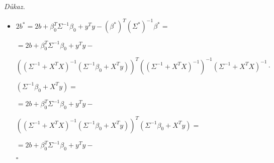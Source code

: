 \documentclass{article}
\newenvironment{pitemize}{
\begin{itemize}
  \setlength{\itemsep}{5pt}
  \setlength{\parskip}{0pt}
  \setlength{\parsep}{0pt}
}{\end{itemize}}
\newenvironment{pproof}{
\noindent\emph{Důkaz.}
\begin{pitemize}
}{\hfill$\square$\end{pitemize}}
\theoremstyle{definition}
\begin{document}
\begin{pproof}
$+(
(\Sigma^{-1}+X^TX)^{-1}(\Sigma^{-1}\beta_0+X^Ty)
)^T
(\Sigma^{-1}\beta_0+X^Ty)=
$


$=\beta^T(\Sigma^{-1}+X^TX)\beta-
2\beta^T(\Sigma^{-1}\beta_0+X^Ty)
+ $
\nopagebreak

$+
(\Sigma^{-1}\beta_0+X^Ty)^T
((\Sigma^{-1}+X^TX)^{-1})^T
(\Sigma^{-1}\beta_0+X^Ty)=
$

$=\beta^T\Sigma^{-1}\beta
+\beta^TX^TX\beta
-2\beta^T\Sigma^{-1}\beta_0
-2\beta^TX^Ty
+ $
\nopagebreak

$+
(\Sigma^{-1}\beta_0+X^Ty)^T
((\Sigma^{-1}+X^TX)^{-1})^T
(\Sigma^{-1}\beta_0+X^Ty)=
$

$=\beta^T\Sigma^{-1}\beta
+\beta^TX^TX\beta
-2\beta^T\Sigma^{-1}\beta_0
-2\beta^TX^Ty
+ $
\nopagebreak

$+
\beta_0^T{\Sigma^{-1}}^T
((\Sigma^{-1}+X^TX)^{-1})^T
\Sigma^{-1}\beta_0
+2
y^TX
((\Sigma^{-1}+X^TX)^{-1})^T
\Sigma^{-1}\beta_0
+$
\nopagebreak


$+y^TX
((\Sigma^{-1}+X^TX)^{-1})^T
X^Ty=
$

$=\beta^T\Sigma^{-1}\beta
+\beta^TX^TX\beta
-2\beta^T\Sigma^{-1}\beta_0
-2\beta^TX^Ty
+ $
\nopagebreak

$+
\beta_0^T{\Sigma^{-1}}
(\Sigma^{-1}+X^TX)^{-1}
\Sigma^{-1}\beta_0
+2
y^TX
(\Sigma^{-1}+X^TX)^{-1}
\Sigma^{-1}\beta_0
+$
\nopagebreak


$+y^TX
(\Sigma^{-1}+X^TX)^{-1}
X^Ty=
$

$=\beta^T\Sigma^{-1}\beta
+\beta^TX^TX\beta
-2\beta^T\Sigma^{-1}\beta_0
-2\beta^TX^Ty
+ $
\nopagebreak

$+
\beta_0^T{\Sigma^{-1}}
{\Sigma^*}
\Sigma^{-1}\beta_0
+2
y^TX
{\Sigma^*}
\Sigma^{-1}\beta_0
+$
\nopagebreak


$+y^TX
{\Sigma^*}
X^Ty
$

\item $2b^*=2b+\beta_0^T\Sigma^{-1}\beta_0+y^Ty
-(\beta^*)^T(\Sigma^*)^{-1}\beta^*=$

$=2b+\beta_0^T\Sigma^{-1}\beta_0+y^Ty
-$
\nopagebreak

$( (\Sigma^{-1}+X^TX)^{-1}(\Sigma^{-1}\beta_0+X^Ty))^T((\Sigma^{-1}+X^TX)^{-1})^{-1} (\Sigma^{-1}+X^TX)^{-1}\cdot
$
\nopagebreak

$
(\Sigma^{-1}\beta_0+X^Ty)=$

$=2b+\beta_0^T\Sigma^{-1}\beta_0+y^Ty
-$
\nopagebreak

$( (\Sigma^{-1}+X^TX)^{-1}(\Sigma^{-1}\beta_0+X^Ty))^T(\Sigma^{-1}\beta_0+X^Ty)
=$

$=2b+\beta_0^T\Sigma^{-1}\beta_0+y^Ty
-$
\nopagebreak


\end{pproof}
\end{document}
